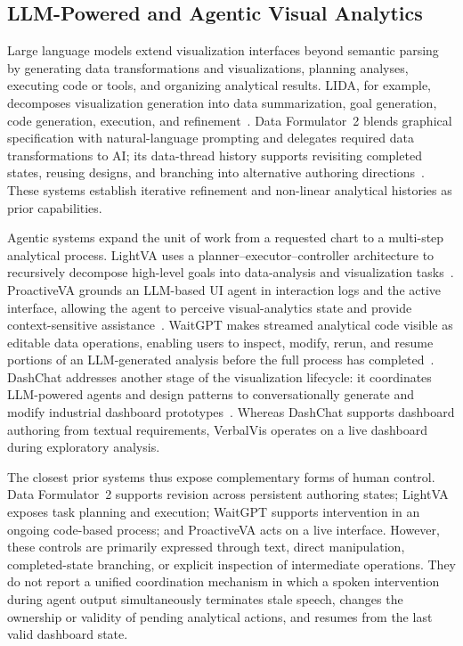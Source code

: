 \documentclass[journal]{IEEEtran}
\begin{document}
\subsection{LLM-Powered and Agentic Visual Analytics}
\label{sec:rw-agentic-va}

Large language models extend visualization interfaces beyond semantic parsing by generating data transformations and visualizations, planning analyses, executing code or tools, and organizing analytical results. LIDA, for example, decomposes visualization generation into data summarization, goal generation, code generation, execution, and refinement~\cite{dibia2023lida}. Data Formulator~2 blends graphical specification with natural-language prompting and delegates required data transformations to AI; its data-thread history supports revisiting completed states, reusing designs, and branching into alternative authoring directions~\cite{wang2024dataformulator2}. These systems establish iterative refinement and non-linear analytical histories as prior capabilities.

Agentic systems expand the unit of work from a requested chart to a multi-step analytical process. LightVA uses a planner--executor--controller architecture to recursively decompose high-level goals into data-analysis and visualization tasks~\cite{zhao2024lightva}. ProactiveVA grounds an LLM-based UI agent in interaction logs and the active interface, allowing the agent to perceive visual-analytics state and provide context-sensitive assistance~\cite{he2025proactiveva}. WaitGPT makes streamed analytical code visible as editable data operations, enabling users to inspect, modify, rerun, and resume portions of an LLM-generated analysis before the full process has completed~\cite{xie2024waitgpt}. DashChat addresses another stage of the visualization lifecycle: it coordinates LLM-powered agents and design patterns to conversationally generate and modify industrial dashboard prototypes~\cite{cheng2026dashchat}. Whereas DashChat supports dashboard authoring from textual requirements, VerbalVis operates on a live dashboard during exploratory analysis.

The closest prior systems thus expose complementary forms of human control. Data Formulator~2 supports revision across persistent authoring states; LightVA exposes task planning and execution; WaitGPT supports intervention in an ongoing code-based process; and ProactiveVA acts on a live interface. However, these controls are primarily expressed through text, direct manipulation, completed-state branching, or explicit inspection of intermediate operations. They do not report a unified coordination mechanism in which a spoken intervention during agent output simultaneously terminates stale speech, changes the ownership or validity of pending analytical actions, and resumes from the last valid dashboard state.
\end{document}
